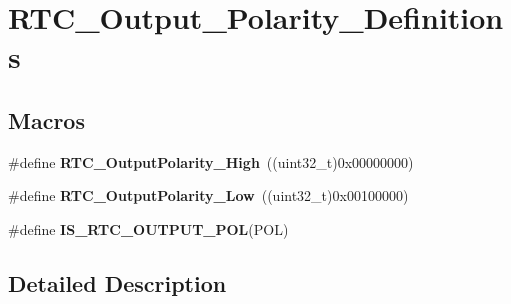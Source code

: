 \hypertarget{group___r_t_c___output___polarity___definitions}{\section{R\-T\-C\-\_\-\-Output\-\_\-\-Polarity\-\_\-\-Definitions}
\label{group___r_t_c___output___polarity___definitions}
}
\subsection*{Macros}
\begin{DoxyCompactItemize}
\item 
\hypertarget{group___r_t_c___output___polarity___definitions_ga0c9b36bf812f02f67d82c02594cc93b3}{\#define {\bfseries R\-T\-C\-\_\-\-Output\-Polarity\-\_\-\-High}~((uint32\-\_\-t)0x00000000)}\label{group___r_t_c___output___polarity___definitions_ga0c9b36bf812f02f67d82c02594cc93b3}

\item 
\hypertarget{group___r_t_c___output___polarity___definitions_ga6900b0eb6f2e3abe65245c49661d55af}{\#define {\bfseries R\-T\-C\-\_\-\-Output\-Polarity\-\_\-\-Low}~((uint32\-\_\-t)0x00100000)}\label{group___r_t_c___output___polarity___definitions_ga6900b0eb6f2e3abe65245c49661d55af}

\item 
\#define {\bfseries I\-S\-\_\-\-R\-T\-C\-\_\-\-O\-U\-T\-P\-U\-T\-\_\-\-P\-O\-L}(P\-O\-L)
\end{DoxyCompactItemize}


\subsection{Detailed Description}


